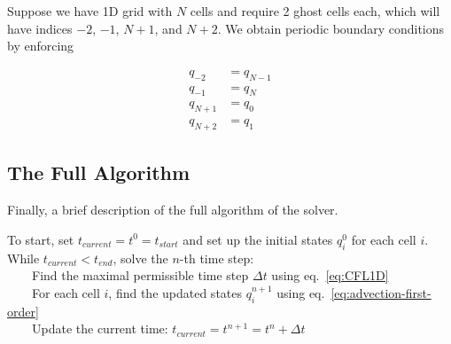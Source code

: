 Suppose we have 1D grid with $N$ cells and require 2 ghost cells each, which will have indices $-2$, $-1$, $N+1$, and $N+2$.
We obtain periodic boundary conditions by enforcing

\begin{align*}
	q_{-2} &= q_{N-1} \\
	q_{-1} &= q_{N}	\\
	q_{N+1} &= q_0 	\\
	q_{N+2} &= q_1 
\end{align*}
	




\subsection{The Full Algorithm}

Finally, a brief description of the full algorithm of the solver.

To start, set $t_{current} = t^0 = t_{start}$ and set up the initial states $q_i^0$ for
each cell $i$.\\[.5em]
%
While $t_{current} < t_{end}$, solve the $n$-th time step:\\[.5em]
%
\indent~~~~Find the maximal permissible time step $\Delta t$ using eq.~\ref{eq:CFL1D} \\[.5em]
%
\indent~~~~For each cell $i$, find the updated states $q_i^{n+1}$ using eq.~\ref{eq:advection-first-order} \\[.5em]
%
\indent~~~~Update the current time: $t_{current} = t^{n+1} = t^n + \Delta t$


